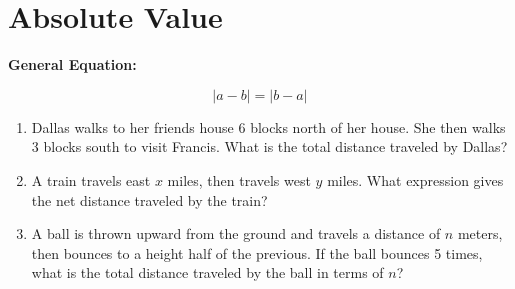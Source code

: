 \section{Absolute Value}

\bigskip
\textbf{General Equation:}

\[|a-b|=|b-a|\]

\vfill
\begin{enumerate}[labelindent=*,style=multiline,leftmargin=*,label=\textbf{Example \arabic*:}]
\item Dallas walks to her friends house 6 blocks north of her house. She then walks 3 blocks south to visit Francis. What is the total distance traveled by Dallas?

\vfill\item A train travels east $x$ miles, then travels west $y$ miles. What expression gives the net distance traveled by the train?

\vfill\item A ball is thrown upward from the ground and travels a distance of $n$ meters, then bounces to a height half of the previous. If the ball bounces 5 times, what is the total distance traveled by the ball in terms of $n$?
\end{enumerate}

